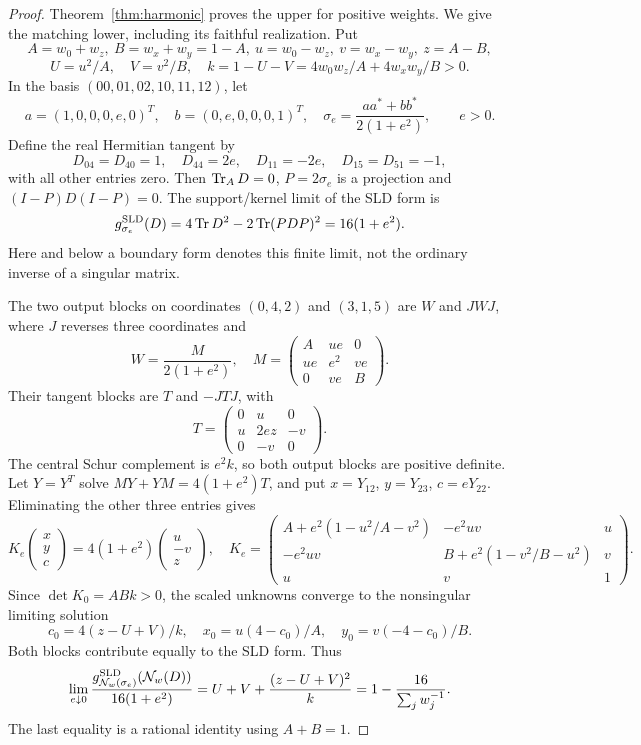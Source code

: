 \begin{proof}
Theorem~\ref{thm:harmonic} proves the upper for positive weights. We give the matching lower, including its faithful realization. Put
\[
 A=w_0+w_z,\ B=w_x+w_y=1-A,\ u=w_0-w_z,\ v=w_x-w_y,\ z=A-B,
\]
\[
 U=u^2/A,\quad V=v^2/B,\quad k=1-U-V=4w_0w_z/A+4w_xw_y/B>0.
\]
In the basis \((00,01,02,10,11,12)\), let
\[
 a=(1,0,0,0,e,0)^T,\quad b=(0,e,0,0,0,1)^T,\quad
 \sigma_e=\frac{aa^*+bb^*}{2(1+e^2)},\qquad e>0.
\]
Define the real Hermitian tangent by
\[
 D_{04}=D_{40}=1,\quad D_{44}=2e,\quad D_{11}=-2e,\quad D_{15}=D_{51}=-1,
\]
with all other entries zero. Then \(\operatorname{Tr}_AD=0\), \(P=2\sigma_e\) is a projection and \((I-P)D(I-P)=0\). The support/kernel limit of the SLD form is
\begin{equation}\label{eq:boundary-input}
 g_{\sigma_e}^{\rm SLD}(D)=4\operatorname{Tr} D^2-2\operatorname{Tr}(PDP)^2=16(1+e^2).
\end{equation}
Here and below a boundary form denotes this finite limit, not the ordinary inverse of a singular matrix.

The two output blocks on coordinates \((0,4,2)\) and \((3,1,5)\) are \(W\) and \(JWJ\), where \(J\) reverses three coordinates and
\[
 W=\frac{M}{2(1+e^2)},\quad M=\begin{pmatrix}A&ue&0\\ue&e^2&ve\\0&ve&B\end{pmatrix}.
\]
Their tangent blocks are \(T\) and \(-JTJ\), with
\[
 T=\begin{pmatrix}0&u&0\\u&2ez&-v\\0&-v&0\end{pmatrix}.
\]
The central Schur complement is \(e^2k\), so both output blocks are positive definite.
Let \(Y=Y^T\) solve \(MY+YM=4(1+e^2)T\), and put \(x=Y_{12}\), \(y=Y_{23}\), \(c=eY_{22}\). Eliminating the other three entries gives
\[
 K_e\begin{pmatrix}x\\y\\c\end{pmatrix}=4(1+e^2)\begin{pmatrix}u\\-v\\z\end{pmatrix},\quad
 K_e=\begin{pmatrix}
 A+e^2(1-u^2/A-v^2)&-e^2uv&u\\
 -e^2uv&B+e^2(1-v^2/B-u^2)&v\\u&v&1
 \end{pmatrix}.
\]
Since \(\det K_0=ABk>0\), the scaled unknowns converge to the nonsingular limiting solution
\[
 c_0=4(z-U+V)/k,\quad x_0=u(4-c_0)/A,\quad y_0=v(-4-c_0)/B.
\]
Both blocks contribute equally to the SLD form. Thus
\begin{equation}\label{eq:pauli-lower}
 \lim_{e\downarrow0}\frac{g_{\mathcal N_w(\sigma_e)}^{\rm SLD}(\mathcal N_w(D))}{16(1+e^2)}
 =U+V+\frac{(z-U+V)^2}{k}
 =1-\frac{16}{\sum_jw_j^{-1}}.
\end{equation}
The last equality is a rational identity using \(A+B=1\).


\end{proof}
